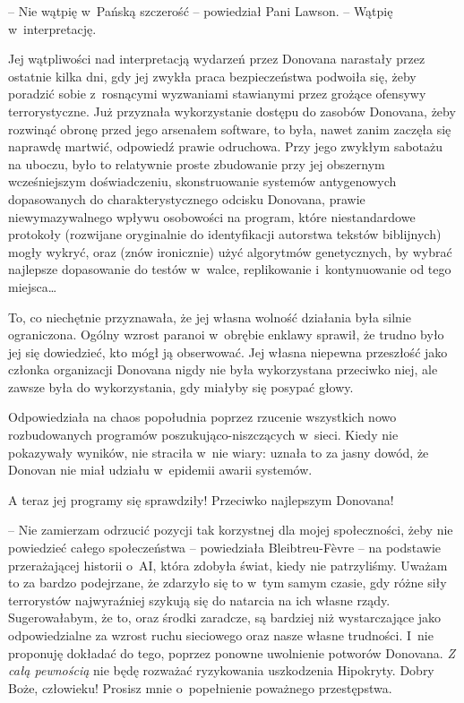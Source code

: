 \documentclass[oneside,polish,11pt,sfheadings]{mwbk}
\begin{document}
-- Nie wątpię w~Pańską szczerość -- powiedział Pani Lawson. -- Wątpię w~interpretację.

Jej wątpliwości nad interpretacją wydarzeń przez Donovana narastały
przez ostatnie kilka dni, gdy jej zwykła praca bezpieczeństwa podwoiła
się, żeby poradzić sobie z~rosnącymi wyzwaniami stawianymi przez grożące
ofensywy terrorystyczne. Już przyznała wykorzystanie dostępu do zasobów
Donovana, żeby rozwinąć obronę przed jego arsenałem software, to była,
nawet zanim zaczęła się naprawdę martwić, odpowiedź prawie odruchowa.
Przy jego zwykłym sabotażu na uboczu, było to relatywnie proste
zbudowanie przy jej obszernym wcześniejszym doświadczeniu, skonstruowanie
systemów antygenowych dopasowanych do charakterystycznego odcisku
Donovana, prawie niewymazywalnego wpływu osobowości na program, które
niestandardowe protokoły (rozwijane oryginalnie do identyfikacji
autorstwa tekstów biblijnych) mogły wykryć, oraz (znów ironicznie) użyć
algorytmów genetycznych, by wybrać najlepsze dopasowanie do testów w~walce, replikowanie i~kontynuowanie od tego miejsca\ldots

To, co niechętnie przyznawała, że jej własna wolność działania była
silnie ograniczona. Ogólny wzrost paranoi w~obrębie enklawy sprawił, że
trudno było jej się dowiedzieć, kto mógł ją obserwować. Jej własna
niepewna przeszłość jako członka organizacji Donovana nigdy nie była
wykorzystana przeciwko niej, ale zawsze była do wykorzystania, gdy
miałyby się posypać głowy.

Odpowiedziała na chaos popołudnia poprzez rzucenie wszystkich nowo
rozbudowanych programów poszukująco-niszczących w~sieci. Kiedy nie
pokazywały wyników, nie straciła w~nie wiary: uznała to za jasny dowód,
że Donovan nie miał udziału w~epidemii awarii systemów.

A teraz jej programy się sprawdziły! Przeciwko najlepszym Donovana!

-- Nie zamierzam odrzucić pozycji tak korzystnej dla mojej społeczności,
żeby nie powiedzieć całego społeczeństwa -- powiedziała Bleibtreu-Fèvre -- na podstawie przerażającej historii o~AI, która zdobyła świat, kiedy
nie patrzyliśmy. Uważam to za bardzo podejrzane, że zdarzyło się to w~tym samym czasie, gdy różne siły terrorystów najwyraźniej szykują się do
natarcia na ich własne rządy. Sugerowałabym, że to, oraz środki
zaradcze, są bardziej niż wystarczające jako odpowiedzialne za wzrost
ruchu sieciowego oraz nasze własne trudności. I~nie proponuję dokładać
do tego, poprzez ponowne uwolnienie potworów Donovana. \emph{Z całą
pewnością} nie będę rozważać ryzykowania uszkodzenia Hipokryty. Dobry
Boże, człowieku! Prosisz mnie o~popełnienie poważnego przestępstwa.
\end{document}
